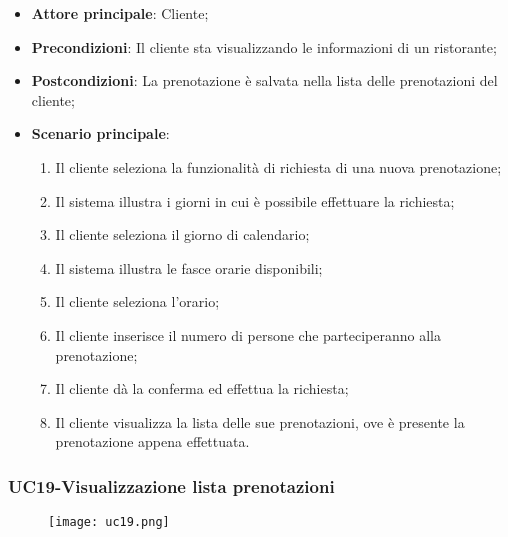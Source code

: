 \begin{itemize}
\item \textbf{Attore principale}: Cliente;
\item \textbf{Precondizioni}: Il cliente sta visualizzando le informazioni di un ristorante;
\item \textbf{Postcondizioni}: La prenotazione è salvata nella lista delle prenotazioni del cliente;
\item \textbf{Scenario principale}:
\begin{enumerate}
\item Il cliente seleziona la funzionalità di richiesta di una nuova prenotazione;
\item Il sistema illustra i giorni in cui è possibile effettuare la richiesta;
\item Il cliente seleziona il giorno di calendario;
\item Il sistema illustra le fasce orarie disponibili;
\item Il cliente seleziona l'orario;
\item Il cliente inserisce il numero di persone che parteciperanno alla prenotazione;
\item Il cliente dà la conferma ed effettua la richiesta;
\item Il cliente visualizza la lista delle sue prenotazioni, ove è presente la prenotazione appena effettuata.
\end{enumerate}
\end{itemize}

\pagebreak
\subsubsection{UC19-Visualizzazione lista prenotazioni} %
\begin{figure}[h] \texttt{[image: uc19.png]} \end{figure}

